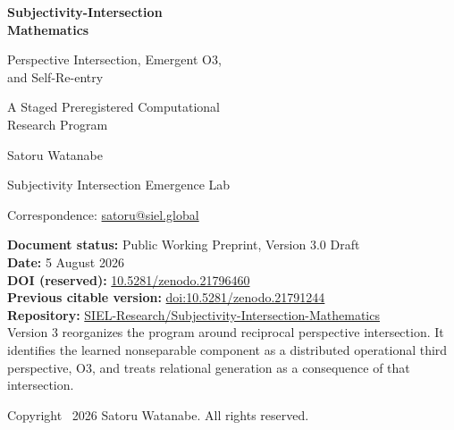 \documentclass[11pt,a4paper]{article}
\begin{document}
\begin{titlepage}
\thispagestyle{empty}
\vspace*{18mm}
{\sffamily\bfseries\color{SIELblue}\fontsize{24}{29}\selectfont
\mbox{Subjectivity-Intersection}\\Mathematics\par}
\vspace{6mm}
{\sffamily\fontsize{18}{23}\selectfont
Perspective Intersection, Emergent O3,\\and Self-Re-entry\par}
\vspace{7mm}
{\sffamily\fontsize{15}{19}\selectfont
A Staged Preregistered Computational\\Research Program\par}

\vspace{18mm}
{\large Satoru Watanabe\par}
\vspace{2mm}
{\normalsize Subjectivity Intersection Emergence Lab\par}
{\normalsize Correspondence: \href{mailto:satoru@siel.global}{satoru@siel.global}\par}

\vfill
\noindent\colorbox{SIELlight}{%
  \parbox{0.93\textwidth}{%
  \vspace{2mm}
  \textbf{Document status:} Public Working Preprint, Version 3.0 Draft\\
  \textbf{Date:} 5 August 2026\\
  \textbf{DOI (reserved):} \href{https://doi.org/10.5281/zenodo.21796460}{10.5281/zenodo.21796460}\\
  \textbf{Previous citable version:} \href{https://doi.org/10.5281/zenodo.21791244}{doi:10.5281/zenodo.21791244}\\
  \textbf{Repository:} \href{https://github.com/SIEL-Research/Subjectivity-Intersection-Mathematics}{SIEL-Research/Subjectivity-Intersection-Mathematics}\\
  Version 3 reorganizes the program around reciprocal perspective intersection. It identifies the learned nonseparable component as a distributed operational third perspective, O3, and treats relational generation as a consequence of that intersection.
  \vspace{2mm}
  }}

\vspace{10mm}
{\small Copyright \textcopyright\ 2026 Satoru Watanabe. All rights reserved.\par}
\end{titlepage}
\end{document}

